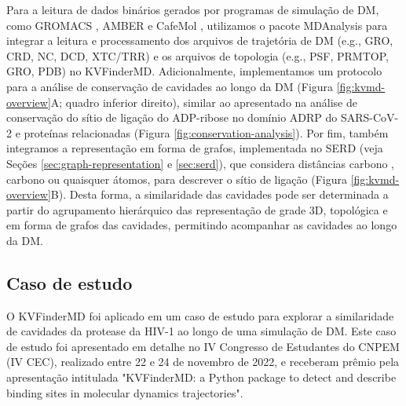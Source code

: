 \documentclass[Portugues]{phdquali}
\def\eg{e.g.\onedot}
\begin{document}
Para a leitura de dados binários gerados por programas de simulação de DM, como GROMACS \cite{gromacs}, AMBER \cite{amber} e CafeMol \cite{kenzaki2011}, utilizamos o pacote MDAnalysis \cite{mdanalysis} para integrar a leitura e processamento dos arquivos de trajetória de DM (\eg, GRO, CRD, NC, DCD, XTC/TRR) e os arquivos de topologia (\eg, PSF, PRMTOP, GRO, PDB) no KVFinderMD. Adicionalmente, implementamos um protocolo para a análise de conservação de cavidades ao longo da DM (Figura \ref{fig:kvmd-overview}A; quadro inferior direito), similar ao apresentado na análise de conservação do sítio de ligação do ADP-ribose no domínio ADRP do SARS-CoV-2 e proteínas relacionadas (Figura \ref{fig:conservation-analysis}). Por fim, também integramos a representação em forma de grafos, implementada no SERD (veja Seções \ref{sec:graph-representation} e \ref{sec:serd}), que considera distâncias carbono \textalpha, carbono \textbeta\space ou quaisquer átomos, para descrever o sítio de ligação (Figura \ref{fig:kvmd-overview}B). Desta forma, a similaridade das cavidades pode ser determinada a partir do agrupamento hierárquico das representação de grade 3D, topológica e em forma de grafos das cavidades, permitindo acompanhar as cavidades ao longo da DM.

\subsection{Caso de estudo}


O KVFinderMD foi aplicado em um caso de estudo para explorar a similaridade de cavidades da protease da HIV-1 ao longo de uma simulação de DM. Este caso de estudo foi apresentado em detalhe no IV Congresso de Estudantes do CNPEM (IV CEC), realizado entre 22 e 24 de novembro de 2022, e receberam prêmio pela apresentação intitulada "KVFinderMD: a Python package to detect and describe binding sites in molecular dynamics trajectories".
\end{document}
